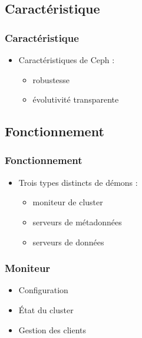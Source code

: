 \documentclass[blue]{beamer}
\begin{document}
        \subsection{Caractéristique}        
        \begin{frame}
                \frametitle{Caractéristique}
                \begin{itemize}
                        \item Caractéristiques de Ceph :
                        \begin{itemize}
                                \item robustesse
                                \item évolutivité transparente
                        \end{itemize}
                \end{itemize}
        \end{frame}

        \subsection{Fonctionnement}
        \begin{frame}
                \frametitle{Fonctionnement}
                \begin{itemize}
                        \item Trois types distincts de démons :
                        \begin{itemize}
                                \item moniteur de cluster
                                \item serveurs de métadonnées
                                \item serveurs de données
                        \end{itemize}
                \end{itemize}
        \end{frame}

        \begin{frame}
                \frametitle{Moniteur}
                \begin{itemize}
                        \item Configuration
                        \item État du cluster
                        \item Gestion des clients
                \end{itemize}
        \end{frame}
\end{document}
